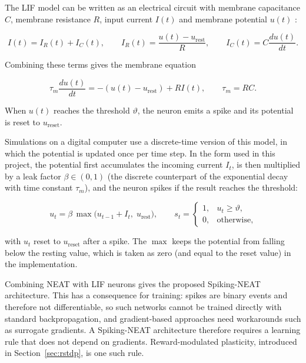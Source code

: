 The LIF model can be written as an electrical circuit with membrane capacitance $C$, membrane resistance $R$, input current $I(t)$ and membrane potential $u(t)$ \cite{gerstner2014}:

\begin{equation}
    I(t) = I_R(t) + I_C(t), \qquad I_R(t) = \frac{u(t)-u_{\mathrm{rest}}}{R}, \qquad I_C(t) = C\frac{du(t)}{dt}.
\end{equation}

Combining these terms gives the membrane equation

\begin{equation}
    \tau_m\frac{du(t)}{dt} = -\left(u(t)-u_{\mathrm{rest}}\right) + R I(t), \qquad \tau_m = RC.
\end{equation}

When $u(t)$ reaches the threshold $\vartheta$, the neuron emits a spike and its potential is reset to $u_{\mathrm{reset}}$.

Simulations on a digital computer use a discrete-time version of this model, in which the potential is updated once per time step. In the form used in this project, the potential first accumulates the incoming current $I_t$, is then multiplied by a leak factor $\beta\in(0,1)$ (the discrete counterpart of the exponential decay with time constant $\tau_m$), and the neuron spikes if the result reaches the threshold:

\begin{equation}
    u_t = \beta\,\max\bigl(u_{t-1} + I_t,\; u_{\mathrm{rest}}\bigr), \qquad s_t = \begin{cases} 1, & u_t \ge \vartheta,\\ 0, & \text{otherwise,}\end{cases}
\end{equation}

with $u_t$ reset to $u_{\mathrm{reset}}$ after a spike. The $\max$ keeps the potential from falling below the resting value, which is taken as zero (and equal to the reset value) in the implementation.

Combining NEAT with LIF neurons gives the proposed Spiking-NEAT architecture. This has a consequence for training: spikes are binary events and therefore not differentiable, so such networks cannot be trained directly with standard backpropagation, and gradient-based approaches need workarounds such as surrogate gradients. A Spiking-NEAT architecture therefore requires a learning rule that does not depend on gradients. Reward-modulated plasticity, introduced in Section~\ref{sec:rstdp}, is one such rule.

